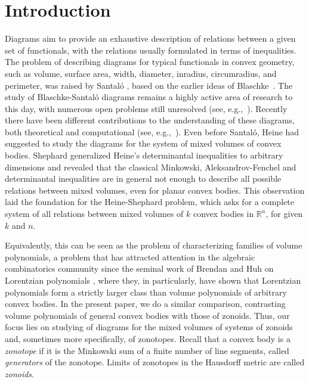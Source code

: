 \documentclass[11pt]{amsart}
\newcommand{\R}{\mathbb R}
\theoremstyle{definition}
\theoremstyle{remark}
\begin{document}
\vspace{3mm}

\section{Introduction}\label{sec:IntrNotMain}


Diagrams aim to provide an exhaustive description of relations between a given set of functionals, with the relations usually formulated in terms of inequalities. The problem of describing diagrams for typical functionals in convex geometry, such as volume, surface area, width, diameter, inradius, circumradius, and perimeter, was raised by Santal\'o \cite{Santalo61}, based on the earlier ideas of Blaschke~\cite{Bl}. %
The study of Blaschke-Santal\'o diagrams remains a highly active area of research to this day, with numerous open problems still unresolved (see, e.g.,~\cite{SY, HC}). Recently there have been different contributions to the understanding of these diagrams, both theoretical and computational (see, e.g.,~\cite{BG, BGM, BGR1, BR, BGR2, FLP, Fto, FHL, FMZ, SZ}).  Even before Santal\'o, Heine \cite{H} had suggested to study the diagrams for the system of mixed volumes of convex bodies. Shephard \cite{Sh} generalized Heine’s determinantal inequalities to arbitrary dimensions and revealed that the classical Minkowski, Aleksandrov-Fenchel and determinantal inequalities are in general not enough to describe all possible relations between mixed volumes, even for planar convex bodies. This observation laid the foundation for the Heine-Shephard problem, which asks for a complete system of all 
relations between mixed volumes of $k$ convex bodies in $\R^n$, for given $k$ and $n$.
 

Equivalently, this can be seen as the problem of characterizing families of volume polynomials, a problem that has attracted attention in the algebraic combinatorics community since the seminal work of Brendan and Huh on Lorentzian polynomials \cite{BH}, where they, in particularly, have shown that Lorentzian polynomials form a strictly larger class than volume polynomials of arbitrary convex bodies. In the present paper, we do a similar comparison, contrasting volume polynomials of general convex bodies with those of zonoids. Thus, our focus lies on studying of diagrams for the mixed volumes of systems of zonoids and, sometimes more specifically, of zonotopes. Recall that a convex body is a {\it zonotope} if it is the Minkowski sum of a finite number of line segments, called {\it generators} of the zonotope. Limits of zonotopes in the Hausdorff metric are called {\it zonoids}.
\end{document}

